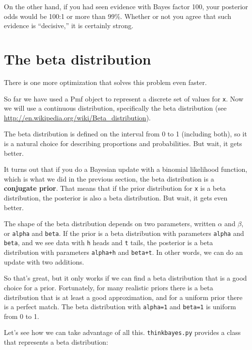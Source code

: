 \documentclass[12pt]{book}
\theoremstyle{exercise}
\newcommand{\py}[1]{{\tt #1}}%
\begin{document}
On the other hand, if you had seen evidence with Bayes
factor 100, your posterior odds would be 100:1 or more than 99\%.
Whether or not you agree that such evidence is ``decisive,''
it is certainly strong.

\section{The beta distribution}
\label{beta}

There is one more optimization that solves this problem
even faster.

So far we have used a Pmf object to represent a discrete set of
values for \py{x}.  Now we will use a continuous
distribution, specifically the beta distribution (see
\url{http://en.wikipedia.org/wiki/Beta_distribution}).

The beta distribution is defined on the interval from 0 to 1
(including both), so it is a natural choice for describing
proportions and probabilities.  But wait, it gets better.


It turns out that if you do a Bayesian update with a binomial
likelihood function, which is what we did in the previous section, the beta
distribution is a {\bf conjugate prior}.  That means that if the prior
distribution for \py{x} is a beta distribution, the posterior is also
a beta distribution.  But wait, it gets even better.

The shape of the beta distribution depends on two parameters, written
$\alpha$ and $\beta$, or \py{alpha} and \py{beta}.  If the prior
is a beta distribution with parameters \py{alpha} and \py{beta}, and
we see data with \py{h} heads and \py{t} tails, the posterior is a
beta distribution with parameters \py{alpha+h} and \py{beta+t}.  In
other words, we can do an update with two additions.

So that's great, but it only works if we can find a beta distribution
that is a good choice for a prior.  Fortunately, for many realistic
priors there is a beta distribution that is at least a good
approximation, and for a uniform prior there is a perfect match.  The
beta distribution with \py{alpha=1} and \py{beta=1} is uniform from
0 to 1.

Let's see how we can take advantage of all this.
\py{thinkbayes.py} provides
a class that represents a beta distribution:
\end{document}

